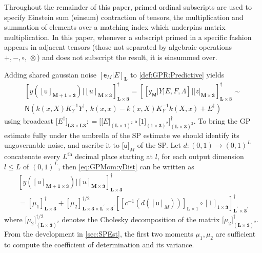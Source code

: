 \documentclass[preprint,12pt]{elsarticle}
\newcommand*{\M}[1]{\ensuremath{#1}\xspace}
\newcommand*{\x}{\times}
\newcommand*{\mi}[1]{\mathbf{#1}}
\newcommand*{\rv}[1]{\mathsf{#1}}
\newcommand*{\te}[2][]{\left\lbrack{#2}\right\rbrack_{#1}}
\newcommand*{\tte}[2][]{\lbrack{#2}\rbrack_{#1}}
\newcommand*{\deq}{\M{\mathrel{\mathop:}=}}
\newcommand*{\gauss}[2]{\mathsf{N}\!\left({#1,#2}\right)}
\begin{document}
    Throughout the remainder of this paper, primed ordinal subscripts are used to specify Einstein sum (einsum) contraction of tensors, the multiplication and summation of elements over a matching index which underpins matrix multiplication. In this paper, whenever a subscript primed in a specific fashion appears in adjacent tensors (those not separated by algebraic operations $+,-,\circ,\,\otimes$) and does not subscript the result, it is einsummed over.
    
    Adding shared gaussian noise $\te[\mi{L}]{\rv{e}_M\vert E}$ to \cref{def:GPR:Predictive} yields
    \begin{multline}\label{eq:GPMom:yDist}
        \te[\mi{L\x 3}]{y(\te[\mi{M+1\x 3}]{\rv{u}}) \big\vert \te[\mi{M\x 3}]{u}}^{\dagger} 
        = \te[\mi{L\x 3}]{\te{\rv{y_M} \vert Y \vert E,F,\Lambda} \big\vert \tte[\mi{M\x 3}]{z}}^{\dagger} \sim \\
        \gauss{k(x,X) K_{Y}^{-1} Y^{\dagger}}{\ k(x,x) - k(x,X) K_{Y}^{-1} k(X,x) + E^{\dagger}}
    \end{multline}
    using broadcast $\tte[\mi{L3\x L3}]{E^{\dagger}} \deq \tte[(\mi{L\x 3})^{2}]{\tte[(\mi{L}\x 1)^{2}]{E} \circ \tte[(1\x\mi{3})^{2}]{1}}^{\dagger}$. 
    To bring the GP estimate fully under the umbrella of the SP estimate we should identify its ungovernable noise, and ascribe it to $\tte[M]{\rv{u}}$ of the SP.
    Let $d\colon (0,1) \to (0,1)^{L}$ concatenate every $L^{\mathrm{th}}$ decimal place starting at $l$, for each output dimension $l\leq L$ of $(0,1)^{L}$, then \cref{eq:GPMom:yDist} can be written as
    \begin{multline}\label{eq:GPMom:yReveal}
        \te[\mi{L\x 3}]{y(\te[\mi{M+1\x 3}]{\rv{u}}) \big\vert \te[\mi{M\x 3}]{u}}^{\dagger} \\
        = \te[\mi{L\x 3}]{\mu_{1}}^{\dagger}
        + \te[\mi{L\x 3\x L^{\prime}\x 3^{\prime}}]{\mu_{2}}^{\dagger/2} \te[\mi{L^{\prime}\x 3^{\prime}}]{\te[\mi{L}\x 1]{c^{-1}\!\left(d\left(\te[M]{\rv{u}}\right)\right)} \circ \te[1\x\mi{3}]{1}}^{\dagger}
    \end{multline}
    where $\tte[(\mi{L\x 3})^{2}]{\mu_{2}}^{\dagger/2}$ denotes the Cholesky decomposition of the matrix $\tte[(\mi{L\x 3})^{2}]{\mu_{2}}^{\dagger}$.
    From the development in \cref{sec:SPEst}, the first two moments $\mu_{1},\mu_{2}$ are sufficient to compute the coefficient of determination and its variance. 
    
\end{document}
